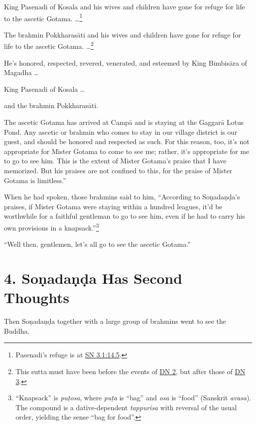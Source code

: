 \documentclass[12pt,openany]{book}%
\begin{document}
King Pasenadi of Kosala and his wives and children have gone for refuge for life to the ascetic Gotama. …\footnote{Pasenadi’s refuge is at \href{https://suttacentral.net/sn3.1/en/sujato\#14.5}{SN 3.1:14.5}. } 

The brahmin \textsanskrit{Pokkharasāti} and his wives and children have gone for refuge for life to the ascetic Gotama. …\footnote{This sutta must have been before the events of \href{https://suttacentral.net/dn2/en/sujato}{DN 2}, but after those of \href{https://suttacentral.net/dn3/en/sujato}{DN 3}. } 

He’s honored, respected, revered, venerated, and esteemed by King \textsanskrit{Bimbisāra} of Magadha … 

King Pasenadi of Kosala … 

and the brahmin \textsanskrit{Pokkharasāti}. 

The ascetic Gotama has arrived at \textsanskrit{Campā} and is staying at the \textsanskrit{Gaggarā} Lotus Pond. Any ascetic or brahmin who comes to stay in our village district is our guest, and should be honored and respected as such. For this reason, too, it’s not appropriate for Mister Gotama to come to see me; rather, it’s appropriate for me to go to see him. This is the extent of Mister Gotama’s praise that I have memorized. But his praises are not confined to this, for the praise of Mister Gotama is limitless.” 

When he had spoken, those brahmins said to him, “According to \textsanskrit{Soṇadaṇḍa}’s praises, if Mister Gotama were staying within a hundred leagues, it’d be worthwhile for a faithful gentleman to go to see him, even if he had to carry his own provisions in a knapsack.”\footnote{“Knapsack” is \textit{\textsanskrit{puṭosa}}, where \textit{\textsanskrit{puṭa}} is “bag” and \textit{osa} is “food” (Sanskrit \textit{avasa}). The compound is a dative-dependent \textit{tappurisa} with reversal of the usual order, yielding the sense “bag for food”. } 

“Well then, gentlemen, let’s all go to see the ascetic Gotama.” 

\section*{4. \textsanskrit{Soṇadaṇḍa} Has Second Thoughts }

Then \textsanskrit{Soṇadaṇḍa} together with a large group of brahmins went to see the Buddha. 
\end{document}
